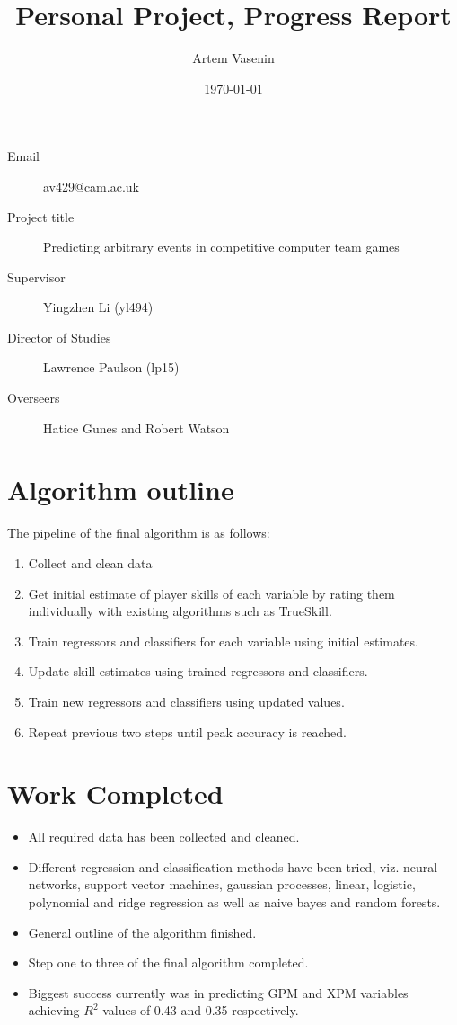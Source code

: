 \documentclass[11pt, a4paper]{article}
\title{Personal Project, Progress Report}
\date{\today}
\author{Artem Vasenin}
\begin{document}
\maketitle


\begin{description}
\item[Email] av429@cam.ac.uk
\item[Project title] Predicting arbitrary events in competitive computer team games
\item[Supervisor] Yingzhen Li (yl494)
\item[Director of Studies] Lawrence Paulson (lp15)
\item[Overseers] Hatice Gunes and Robert Watson
\end{description}

\section*{Algorithm outline}
The pipeline of the final algorithm is as follows:
\begin{enumerate}
\item Collect and clean data
\item Get initial estimate of player skills of each variable by rating them individually with existing algorithms such as TrueSkill.
\item Train regressors and classifiers for each variable using initial estimates.
\item Update skill estimates using trained regressors and classifiers.
\item Train new regressors and classifiers using updated values.
\item Repeat previous two steps until peak accuracy is reached.
\end{enumerate}

\section*{Work Completed}
\begin{itemize}
\item All required data has been collected and cleaned.
\item Different regression and classification methods have been tried, viz. neural networks, support vector machines, gaussian processes, linear, logistic, polynomial and ridge regression as well as naive bayes and random forests.
\item General outline of the algorithm finished.
\item Step one to three of the final algorithm completed.
\item Biggest success currently was in predicting GPM and XPM variables achieving $R^2$ values of 0.43 and 0.35 respectively.
\end{itemize}
\end{document}
